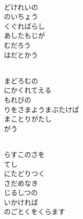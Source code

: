 \documentclass[10pt,b5j]{tarticle} %
\begin{document}
\vspace{1.5em} %
\newcommand{\linespace}{0.5em} %
\newcommand{\blocksize}{0.5\hsize} %
\newcommand{\itemmargin}{6em} %
\begin{enumerate} %
    \setlength{\itemindent}{\itemmargin} %
    \begin{minipage}[c]{\blocksize}
    
        \vspace{\linespace}
        \item~\\
        どけれいの\\
        のいちょう\\
        くぐればらし\\
        あしたもじが\\
        むだろう\\
        はだとかう
        
        \vspace{\linespace}
        \item~\\
        まどろむの\\
        にかくれてえる\\
        もれびの\\
        りをさまようまぶたけば\\
        まことりがたし\\
        がう
        
        \vspace{\linespace}
        \item~\\
        らすこのさを\\
        てし\\
        にたどりつく\\
        さだめなき\\
        じるしつの\\
        いかければ\\
        のごとくをくらます
        

\end{minipage}
\end{enumerate}
\end{document}
